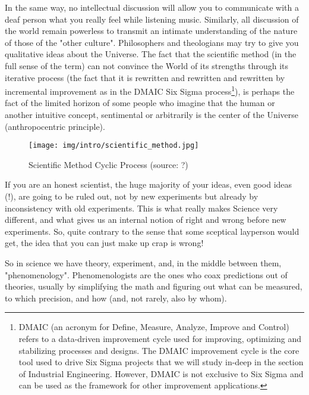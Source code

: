 	In the same way, no intellectual discussion will allow you to communicate with a deaf person what you really feel while listening music. Similarly, all discussion of the world remain powerless to transmit an intimate understanding of the nature of those of the "other culture". Philosophers and theologians may try to give you qualitative ideas about the Universe. The fact that the scientific method (in the full sense of the term) can not convince the World of its strengths through its iterative process (the fact that it is rewritten and rewritten and rewritten by incremental improvement as in the DMAIC Six Sigma process\footnote{DMAIC (an acronym for Define, Measure, Analyze, Improve and Control) refers to a data-driven improvement cycle used for improving, optimizing and stabilizing processes and designs. The DMAIC improvement cycle is the core tool used to drive Six Sigma projects that we will study in-deep in the section of Industrial Engineering. However, DMAIC is not exclusive to Six Sigma and can be used as the framework for other improvement applications.}), is perhaps the fact of the limited horizon of some people who imagine that the human or another intuitive concept, sentimental or arbitrarily is the center of the Universe (anthropocentric principle).
	\begin{figure}[H]
		\centering
		\texttt{[image: img/intro/scientific\_method.jpg]}
		\caption[Scientific Method Cyclic Process]{Scientific Method Cyclic Process (source: ?)}
	\end{figure} 
	
	\begin{tcolorbox}[title=Remark,colframe=black,arc=10pt]
	If you are an honest scientist, the huge majority of your ideas, even good
ideas (!), are going to be ruled out, not by new experiments but already by
inconsistency with old experiments. This is what really makes Science very
different, and what gives us an internal notion of right and wrong before new
experiments. So, quite contrary to the sense that some sceptical layperson
would get, the idea that you can just make up crap is wrong!
	\end{tcolorbox}
	
	So in science we have theory, experiment, and, in the middle between
them, "phenomenology". Phenomenologists are the ones who coax predictions out of theories, usually by simplifying the math and figuring out what can be measured, to which precision, and how (and, not rarely, also by whom).
	
